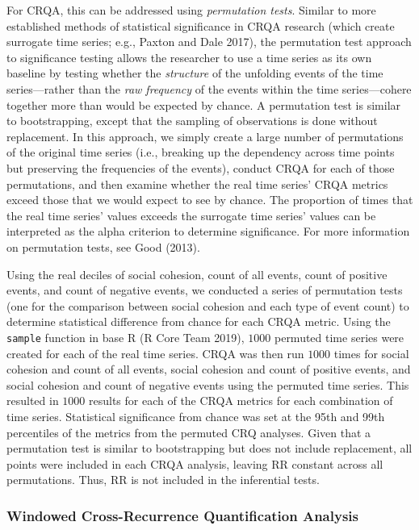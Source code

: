 \documentclass[
  english,
  man]{apa6}
\begin{document}
For CRQA, this can be addressed using \emph{permutation tests}. Similar to more
established methods of statistical significance in CRQA research (which create
surrogate time series; e.g., Paxton and Dale 2017), the permutation test
approach to significance testing allows the researcher to use a time series as
its own baseline by testing whether the \emph{structure} of the unfolding events of
the time series---rather than the \emph{raw frequency} of the events within the time
series---cohere together more than would be expected by chance. A permutation
test is similar to bootstrapping, except that the sampling of observations is
done without replacement. In this approach, we simply create a large number of
permutations of the original time series (i.e., breaking up the dependency
across time points but preserving the frequencies of the events), conduct CRQA
for each of those permutations, and then examine whether the real time series'
CRQA metrics exceed those that we would expect to see by chance. The proportion
of times that the real time series' values exceeds the surrogate time series'
values can be interpreted as the alpha criterion to determine significance. For
more information on permutation tests, see Good (2013).

Using the real deciles of social cohesion, count of all events, count of
positive events, and count of negative events, we conducted a series of
permutation tests (one for the comparison between social cohesion and each type
of event count) to determine statistical difference from chance for each CRQA
metric. Using the \texttt{sample} function in base R (R Core Team 2019), \(1000\) permuted time
series were created for each of the real time series. CRQA was then run \(1000\)
times for social cohesion and count of all events, social cohesion and count of
positive events, and social cohesion and count of negative events using the
permuted time series. This resulted in \(1000\) results for each of the CRQA
metrics for each combination of time series. Statistical significance from
chance was set at the 95th and 99th percentiles of the metrics from the permuted
CRQ analyses. Given that a permutation test is similar to bootstrapping but does
not include replacement, all points were included in each CRQA analysis, leaving
RR constant across all permutations. Thus, RR is not included in the inferential
tests.

\hypertarget{windowed-cross-recurrence-quantification-analysis}{%
\subsubsection{Windowed Cross-Recurrence Quantification Analysis}\label{windowed-cross-recurrence-quantification-analysis}}
\end{document}
